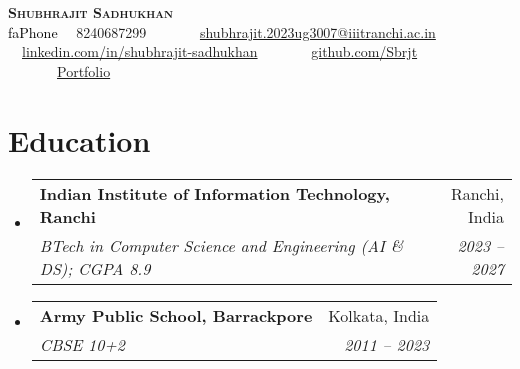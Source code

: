 \documentclass[letterpaper,11pt]{article}
\makeatletter
\newcommand{\resumeSubheading}[4]{
\vspace{-2pt}\item
\begin{tabular*}{0.97\textwidth}[t]{l@{\extracolsep{\fill}}r}
\textbf{#1} & #2 \\
\textit{\small#3} & \textit{\small #4} \\
\end{tabular*}\vspace{-7pt}
}
\newcommand{\resumeSubHeadingListStart}{\begin{itemize}[leftmargin=0.15in, label={}]}
\newcommand{\resumeSubHeadingListEnd}{\end{itemize}}
\newcommand{\seticon}[1]{\textcolor{Black}{\csname #1\endcsname}}
\makeatother
\begin{document}

\begin{center}
\textbf{\Huge \scshape Shubhrajit Sadhukhan} \\ \vspace{5pt}
\small \seticon{faPhone} \ \ 8240687299 \ \ \ \ \ \faEnvelope \ \ \href{mailto:shubhrajit.2023ug3007@iiitranchi.ac.in}{shubhrajit.2023ug3007@iiitranchi.ac.in} \\
\vspace{3pt}
\faLinkedin \ \ \href{https://linkedin.com/in/shubhrajit-sadhukhan}{linkedin.com/in/shubhrajit-sadhukhan} \ \ \ \ \
\faGithub \ \ \href{https://github.com/Sbrjt}{github.com/Sbrjt} \ \ \ \ \
\faLink \ \ \href{https://sbrjt.github.io/}{Portfolio}
\end{center}

\begin{comment}
\begin{minipage}[t]{0.48\textwidth}
\textbf{\Huge \scshape Shubhrajit \\ Sadhukhan} \\
\href{https://sbrjt.github.io/}{sbrjt.github.io}
\end{minipage}
\hfill
\begin{minipage}[t]{0.48\textwidth}
\raggedleft
\small
\faPhone\ 8240687299 \\
\faEnvelope \ \href{mailto:shubhrajit.2023ug3007@iiitranchi.ac.in}{shubhrajit.2023ug3007@iiitranchi.ac.in} \\
\faLinkedin \ \ \href{https://linkedin.com/in/shubhrajit-sadhukhan}{linkedin.com/in/shubhrajit-sadhukhan} \\
\faGithub \ \href{https://github.com/Sbrjt}{github.com/Sbrjt}
\end{minipage}
\end{comment}

\section{Education}
\resumeSubHeadingListStart
\resumeSubheading
{Indian Institute of Information Technology, Ranchi}{Ranchi, India}
{BTech in Computer Science and Engineering (AI \& DS); CGPA 8.9}{2023 -- 2027}
\resumeSubheading
{Army Public School, Barrackpore}{Kolkata, India}
{CBSE 10+2}{2011 -- 2023}
\resumeSubHeadingListEnd



\end{document}
